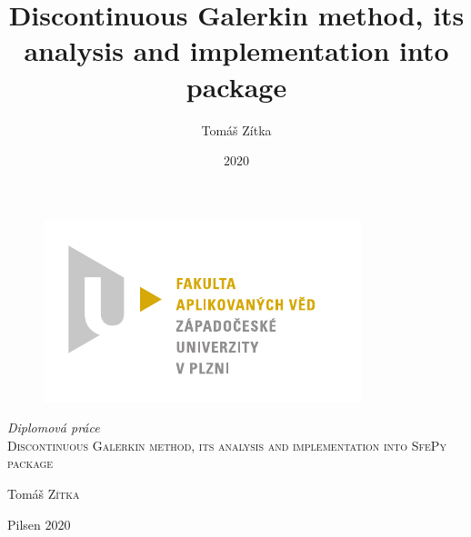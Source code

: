 \documentclass[openany]{book}
\title{Discontinuous Galerkin method, its analysis and implementation into \sfepy{} package}
\author{Tomáš Zítka}
\date{$2020$}
\theoremstyle{definition}
\numberwithin{equation}{section}
\numberwithin{table}{section}
\begin{document}
\begin{titlepage}
	\begin{figure}[h]
 	 \centering
 	 \includegraphics[scale=1]{./fav_cmyk.pdf}
 	\end{figure}
 	\center %

	\textit{{\large Diplomová práce}}\\[1.5cm]
	\textsc{\LARGE  Discontinuous Galerkin method, its analysis and
	implementation into SfePy package}\\

	\vfill
	\begin{minipage}{0.4 \textwidth}
		\begin{flushleft}
		Tomáš \textsc{Zítka}\\
		\end{flushleft}
	\end{minipage}
	\begin{minipage}{0.4\textwidth}
		\begin{flushright}
		Pilsen $2020$
		\end{flushright}
	\end{minipage}
\end{titlepage}
\end{document}
